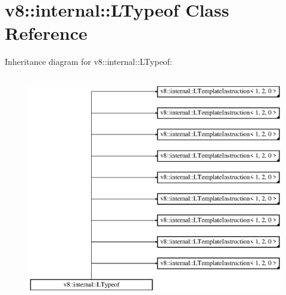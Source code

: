 \hypertarget{classv8_1_1internal_1_1_l_typeof}{}\section{v8\+:\+:internal\+:\+:L\+Typeof Class Reference}
\label{classv8_1_1internal_1_1_l_typeof}
Inheritance diagram for v8\+:\+:internal\+:\+:L\+Typeof\+:\begin{figure}[H]
\begin{center}
\leavevmode
\includegraphics[height=10.000000cm]{classv8_1_1internal_1_1_l_typeof}
\end{center}
\end{figure}
